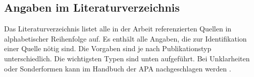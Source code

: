 \subsection{Angaben im Literaturverzeichnis}\label{subsubsec:angaben}

Das Literaturverzeichnis listet alle in der Arbeit referenzierten Quellen in alphabetischer Reihenfolge auf. Es enthält alle Angaben, die zur Identifikation einer Quelle nötig sind. Die Vorgaben sind je nach Publikationstyp unterschiedlich. Die wichtigsten Typen sind unten aufgeführt. Bei Unklarheiten oder Sonderformen kann im Handbuch der APA nachgeschlagen werden \cite{american2010concise}.


\makeatletter 
\renewcommand\BR@b@bibitem[2][]{\BR@bibitem[#1]{#2}\BR@c@bibitem{#2}}           
\makeatother

\nobibliography*%

























